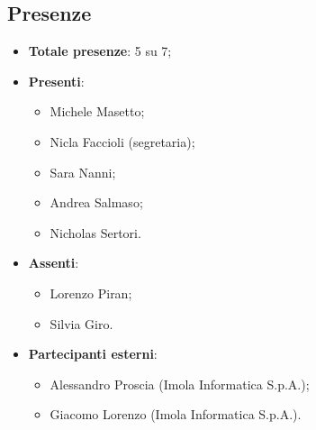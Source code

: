 \documentclass[11pt]{article}
\begin{document}
	\subsection{Presenze}
	\begin{itemize}
		\item \textbf{Totale presenze}: 5 su 7;
		\item \textbf{Presenti}:
		\begin{itemize}  
			\item Michele Masetto;
			\item Nicla Faccioli (segretaria);
			\item Sara Nanni;
			\item Andrea Salmaso;
			\item Nicholas Sertori.
		\end{itemize}
		\item \textbf{Assenti}:
			\begin{itemize}
				\item Lorenzo Piran;
				\item Silvia Giro.
			\end{itemize}
		\item \textbf{Partecipanti esterni}:
			\begin{itemize}
				\item Alessandro Proscia (Imola Informatica S.p.A.);
				\item Giacomo Lorenzo (Imola Informatica S.p.A.).
			\end{itemize}
	\end{itemize}

	\newpage
\end{document}

